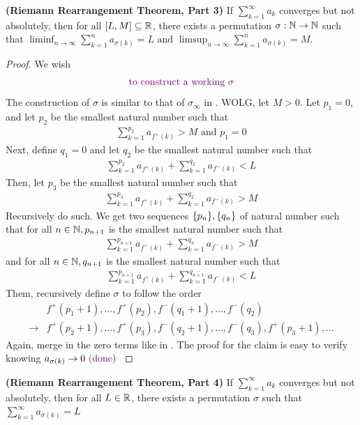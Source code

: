 \documentclass{report}
\begin{document}
\begin{theorem}
\label{t2}
\textbf{(Riemann Rearrangement Theorem, Part 3)} If $\sum_{k=1}^\infty a_k$ converges but not absolutely, then for all $[L,M]\subseteq \mathbb{R}$, there exists a permutation $\sigma:\mathbb{N}\rightarrow \mathbb{N}$ such that $\liminf_{n\to\infty} \sum_{k=1}^n a_{\sigma(k)}=L\text{ and }\limsup_{n\to\infty} \sum_{k=1}^n a_{\sigma(k)}=M$.
\end{theorem}
\begin{proof}
We wish 
\begin{align*}
\textcolor{violet}{\text{ to construct a working $\sigma$ }}
\end{align*}
The construction of $\sigma$ is similar to that of $\sigma_{\infty}$ in . WOLG, let $M>0$. Let $p_1=0$, and let  $p_2$ be the smallest natural number such that 
 \begin{align*}
\sum_{k=1}^{p_2}a_{f^+(k)}>M\text{ and }p_1=0
\end{align*}
Next, define $q_1=0$ and let $q_2$ be the smallest natural number such that 
 \begin{align*}
\sum_{k=1}^{p_2}a_{f^+(k)}+\sum_{k=1}^{q_2} a_{f^-(k)}<L
\end{align*}
Then, let $p_3$ be the smallest natural number such that 
\begin{align*}
\sum_{k=1}^{p_3}a_{f^+(k)}+\sum_{k=1}^{q_2}a_{f^-(k)}>M
\end{align*}
Recursively do such. We get two sequences $\{ p_n \},\{ q_n \}$ of natural number such that for all $n\in\mathbb{N},p_{n+1}$ is the smallest natural number such that 
\begin{align*}
\sum_{k=1}^{p_{n+1}} a_{f^+(k)} +\sum_{k=1}^{q_n}a_{f^-(k)}>M
\end{align*}
and for all $n\in\mathbb{N},q_{n+1}$ is the smallest natural number such that 
\begin{align*}
\sum_{k=1}^{p_{n+1}}a_{f^+(k)} + \sum_{k=1}^{q_{n+1}} a_{f^-(k)}<L
\end{align*}
Them, recursively define $\sigma$ to follow the order 
\begin{align*}
&f^+(p_1+1),\dots,f^+(p_2),f^-(q_1+1),\dots ,f^-(q_2)\\
  \longrightarrow &  f^+(p_2+1),\dots ,f^+(p_3),f^-(q_2+1),\dots ,f^-(q_3),f^+(p_3+1),\dots 
\end{align*}
Again, merge in the zero terms like in   . The proof for the claim   is easy to verify knowing $a_{\sigma(k)}\to 0\textcolor{violet}{\text{ (done) }}$ 
\end{proof}
\begin{corollary}
\label{t3}
\textbf{(Riemann Rearrangement Theorem, Part 4)} If $\sum_{k=1}^\infty a_k$ converges but not absolutely, then for all $L \in\mathbb{R}$, there exists a permutation $\sigma$ such that $\sum_{k=1}^\infty a_{\sigma(k)}=L$
\end{corollary}
\end{document}
